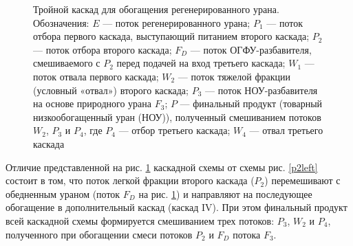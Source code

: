 \begin{figure}[ht]
    \caption{Тройной каскад для обогащения регенерированного урана. Обозначения: $E$ --- поток регенерированного урана; $P_1$ --- поток отбора первого каскада, выступающий питанием второго каскада; $P_2$ --- поток отбора второго каскада; $F_{D}$ --- поток ОГФУ-разбавителя, смешиваемого с $P_2$ перед подачей на вход третьего каскада; $W_1$ --- поток отвала первого каскада; $W_2$ --- поток тяжелой фракции (условный «отвал») второго каскада; $P_3$ --- поток НОУ-разбавителя на основе природного урана $F_3$; $P$ --- финальный продукт (товарный низкообогащенный уран (НОУ)), полученный смешиванием потоков $W_2$, $P_3$ и $P_4$, где $P_4$ --- отбор третьего каскада; $W_4$ --- отвал третьего каскада}\label{p2_withDepU}
\end{figure}

Отличие представленной на рис. \ref{p2_withDepU} каскадной схемы от схемы рис. \ref{p2left} состоит в том, что поток легкой фракции второго каскада ($P_2$) перемешивают с обедненным ураном (поток $F_{D}$ на рис. \ref{p2_withDepU}) и направляют на последующее обогащение в дополнительный каскад (каскад IV). При этом финальный продукт всей каскадной схемы формируется смешиванием трех потоков: $P_3$, $W_2$ и $P_4$, полученного при обогащении смеси потоков $P_2$ и $F_{D}$ потока $F_3$.

